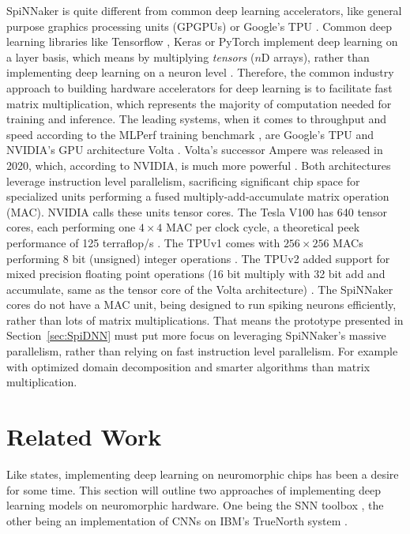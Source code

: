 \documentclass[]{article}
\begin{document}
SpiNNaker is quite different from common deep learning accelerators,
like general purpose graphics processing units (GPGPUs) or Google's
TPU \citep{jouppi_et_al_2017}.
Common deep learning libraries like Tensorflow
\citep{abadi_et_al_2015}, Keras \citep{keras} or PyTorch
\citep{paszke_et_al_2019} implement
deep learning on a layer basis, which means by multiplying
\textit{tensors} ($n$D arrays), rather than implementing deep learning
on a neuron level \citep{goodfellow_et_al_2016}.
Therefore, the common industry approach to building hardware
accelerators for deep learning is to facilitate fast matrix
multiplication, which represents the majority of computation needed
for training and inference.
The leading systems, when it comes to throughput and speed according
to the MLPerf training benchmark \citep{mlperf_2019}, are Google's
TPU \citep{jouppi_et_al_2017} and NVIDIA's GPU architecture
Volta \citep{durant_et_al_2017}.
Volta's successor Ampere was released in 2020, which, according to
NVIDIA, is much more powerful \citep{krashinsky_et_al_2020}.
Both architectures leverage instruction level parallelism, sacrificing
significant chip space for specialized units performing a
fused multiply-add-accumulate matrix operation (MAC).
NVIDIA calls these units tensor cores. The Tesla V100 has 640 tensor
cores, each performing one $4\times 4$ MAC per clock cycle, a
theoretical peek performance of 125 terraflop/s
\citep{markidis_et_al_2018}.
The TPUv1 comes with $256\times256$ MACs performing 8 bit (unsigned)
integer operations \citep{jouppi_et_al_2017}.
The TPUv2 added support for mixed precision floating point operations
(16 bit multiply with 32 bit add and accumulate, same as the
tensor core of the Volta architecture)
\citep{kennedy_2017, markidis_et_al_2018}.
The SpiNNaker cores do not have a MAC unit, being designed to run
spiking neurons efficiently, rather than lots of matrix
multiplications.
That means the prototype presented in Section~\ref{sec:SpiDNN} must
put more focus on leveraging SpiNNaker's massive parallelism, rather
than relying on fast instruction level parallelism.
For example with optimized domain decomposition and smarter algorithms
than matrix multiplication.




\section{Related Work} %
\label{sec:related_work}

Like \citet{gomes_2017} states, implementing deep learning on
neuromorphic chips has been a desire for some time.
This section will outline two approaches of implementing deep learning
models on neuromorphic hardware.
One being the SNN toolbox \citep{rueckauer_et_al_2017}, the other
being an implementation of CNNs on IBM's TrueNorth system
\citep{esser_et_al_2016}.
\end{document}
